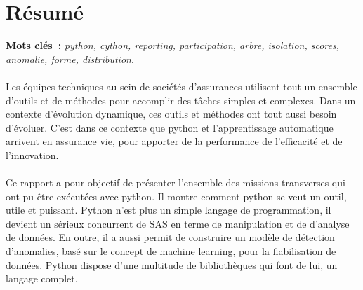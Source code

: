 \chapter*{Résumé} 

\textbf{Mots clés~:} \emph{python, cython, reporting, participation, arbre, isolation, scores, anomalie, forme, distribution}.
\\
\\
Les équipes techniques au sein de sociétés d'assurances utilisent tout un ensemble d'outils et de méthodes pour accomplir des tâches simples et complexes. Dans un contexte d'évolution dynamique, ces outils et méthodes ont tout aussi besoin d'évoluer. C'est dans ce contexte que python et l'apprentissage automatique arrivent en assurance vie, pour apporter de la performance de l'efficacité et de l'innovation. 
\\
\\
Ce rapport a pour objectif de présenter l'ensemble des missions transverses qui ont pu être exécutées avec python. Il montre comment python se veut un outil, utile et puissant. Python n'est plus un simple langage de programmation, il devient un sérieux concurrent de SAS en terme de manipulation et de d'analyse de données. En outre, il a aussi permit de construire un modèle de détection d'anomalies, basé sur le concept de machine learning, pour la fiabilisation de données. Python dispose d'une multitude de bibliothèques qui font de lui, un langage complet.

